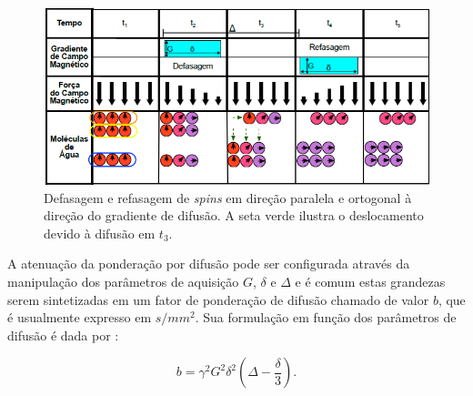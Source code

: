 \documentclass[
    12pt,                %
    oneside,            %
    a4paper,            %
    english,            %
    french,                %
    spanish,            %
    brazil                %
    ]{abntex2}
\begin{document}
\begin{figure}[ht]

    \centering
    \includegraphics[width=.8\linewidth, angle=0]{figs/HARDI/ilustracao_limitacao.png}
    \caption{Defasagem e refasagem de \textit{spins} em direção paralela e ortogonal à direção do gradiente de difusão. A seta verde ilustra o deslocamento devido à difusão em $t_3$.
    }
    \label{fig::ilustracao_pgse_direcao}
   \hspace{1pt}
\end{figure}


A atenuação da ponderação por difusão pode ser configurada através da manipulação dos parâmetros de aquisição $G$, $\delta$ e $\Delta$ e é comum estas grandezas serem sintetizadas em um fator de ponderação de difusão chamado de valor $b$, que é usualmente expresso em $s/mm^2$. Sua formulação em função dos parâmetros de difusão é dada por \cite{lebihan1985}:


\begin{equation}
\label{eq::bvalue}
    b = \gamma^2G^2\delta^2(\Delta - \frac{\delta}{3}).
\end{equation}
\end{document}
